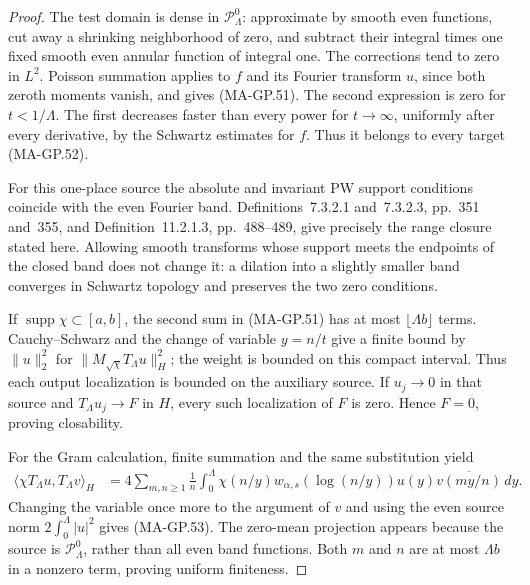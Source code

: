 \begin{proof}
The test domain is dense in $\mathcal P_\Lambda^0$:
approximate by smooth even functions, cut away a shrinking
neighborhood of zero, and subtract their integral times
one fixed smooth even annular function of integral one.
The corrections tend to zero in $L^2$.
Poisson summation applies to $f$ and its Fourier transform
$u$, since both zeroth moments vanish, and gives (MA-GP.51).
The second expression is zero for $t<1/\Lambda$.
The first decreases faster than every power for $t\to\infty$,
uniformly after every derivative, by the Schwartz estimates
for $f$.  Thus it belongs to every target (MA-GP.52).

For this one-place source the absolute and invariant PW
support conditions coincide with the even Fourier band.
Definitions~7.3.2.1 and~7.3.2.3, pp.~351 and~355,
and Definition~11.2.1.3, pp.~488--489, give precisely the
range closure stated here.  Allowing smooth transforms
whose support meets the endpoints of the closed band
does not change it: a dilation into a slightly smaller
band converges in Schwartz topology and preserves the
two zero conditions.

If $\operatorname{supp}\chi\subset[a,b]$, the second
sum in (MA-GP.51) has at most $\lfloor\Lambda b\rfloor$
terms.  Cauchy--Schwarz and the change of variable $y=n/t$
give a finite bound by $\|u\|_2^2$ for
$\|M_{\sqrt\chi}T_\Lambda u\|_H^2$; the weight is bounded
on this compact interval.  Thus each output localization
is bounded on the auxiliary source.
If $u_j\to0$ in that source and $T_\Lambda u_j\to F$
in $H$, every such localization of $F$ is zero.
Hence $F=0$, proving closability.

For the Gram calculation, finite summation and the same
substitution yield
\[
 \begin{aligned}
 \langle \chi T_\Lambda u,T_\Lambda v\rangle_H
  &=4\sum_{m,n\ge1}\frac1n\int_0^\Lambda
       \chi(n/y)w_{\alpha,s}(\log(n/y))
                       u(y)\overline{v(my/n)}\,dy.
 \end{aligned}
 \tag{MA-GP.54}
\]
Changing the variable once more to the argument of $v$
and using the even source norm $2\int_0^\Lambda|u|^2$
gives (MA-GP.53).  The zero-mean projection appears because
the source is $\mathcal P_\Lambda^0$, rather than all even
band functions.  Both $m$ and $n$ are at most $\Lambda b$
in a nonzero term, proving uniform finiteness.
\end{proof}


